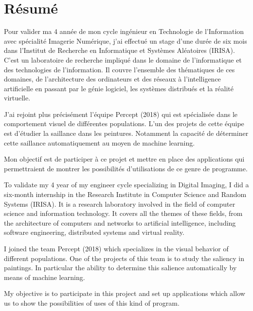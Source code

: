 \chapter*{Résumé}
\par
    Pour valider ma 4 année de mon cycle ingénieur en Technologie de 
    l'Information avec spécialité Imagerie Numérique, j'ai effectué un stage 
    d'une durée de six mois dans l'Institut de Recherche en Informatique et 
    Systèmes Aléatoires (IRISA). C'est un laboratoire de recherche impliqué dans 
    le domaine de l'informatique et des technologies de l'information. Il couvre 
    l'ensemble des thématiques de ces domaines, de l’architecture des 
    ordinateurs et des réseaux à l’intelligence artificielle en passant par le 
    génie logiciel, les systèmes distribués et la réalité virtuelle.

\par
    J'ai rejoint plus précisément l'équipe Percept (2018) qui est spécialisée 
    dans le comportement visuel de différentes populations. L'un des projets de 
    cette équipe est d'étudier la saillance dans les peintures. Notamment la capacité 
    de déterminer cette saillance automatiquement au moyen de machine learning.

\par
    Mon objectif est de participer à ce projet et mettre en place des 
    applications qui permettraient de montrer les possibilités d'utilisations de 
    ce genre de programme.

\vspace{40pt}

\color{gray}
\par
    To validate my 4 year of my engineer cycle specializing in Digital 
    Imaging, I did a six-month internship in the Research Institute in Computer 
    Science and Random Systems (IRISA). It is a research laboratory involved in 
    the field of computer science and information technology. It covers all the 
    themes of these fields, from the architecture of computers and networks to 
    artificial intelligence, including software engineering, distributed systems 
    and virtual reality. 

\par
    I joined the team Percept (2018) which specializes in the visual behavior of 
    different populations. One of the projects of this team is to study the 
    saliency in paintings. In particular the ability to determine this salience 
    automatically by means of machine learning. 

\par
    My objective is to participate in this project and set up applications which 
    allow us to show the possibilities of uses of this kind of program.

\color{black}